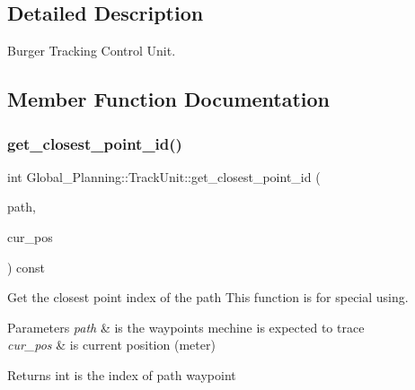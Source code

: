 \subsection{Detailed Description}
Burger Tracking Control Unit. 



\subsection{Member Function Documentation}
\mbox{\label{class_global___planning_1_1_track_unit_af206846d5a6ddbef34e23341a9dcf5d1}} 
\subsubsection{\texorpdfstring{get\+\_\+closest\+\_\+point\+\_\+id()}{get\_closest\_point\_id()}}
{\footnotesize\ttfamily int Global\+\_\+\+Planning\+::\+Track\+Unit\+::get\+\_\+closest\+\_\+point\+\_\+id (\begin{DoxyParamCaption}\item[{const nav\+\_\+msgs\+::\+Path \&}]{path,  }\item[{const geometry\+\_\+msgs\+::\+Pose \&}]{cur\+\_\+pos }\end{DoxyParamCaption}) const}



Get the closest point index of the path This function is for special using. 


\begin{DoxyParams}{Parameters}
{\em path} & is the waypoints mechine is expected to trace \\
\hline
{\em cur\+\_\+pos} & is current position (meter) \\
\hline
\end{DoxyParams}
\begin{DoxyReturn}{Returns}
int is the index of path waypoint 
\end{DoxyReturn}
\mbox{\label{class_global___planning_1_1_track_unit_ab55bd7b7b30500844bad389101ca9a0c}} 
